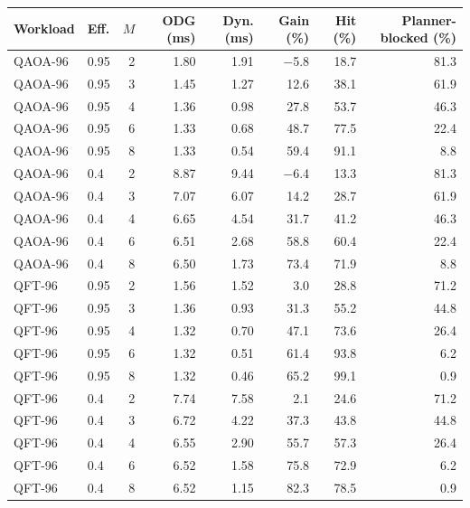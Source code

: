 \begin{tabular}{llrrrrrr}
\toprule
Workload & Eff. & $M$ & ODG (ms) & Dyn. (ms) & Gain (\%) & Hit (\%) & Planner-blocked (\%) \\
\midrule
QAOA-96 & 0.95 & 2 & 1.80 & 1.91 & $-$5.8 & 18.7 & 81.3 \\
QAOA-96 & 0.95 & 3 & 1.45 & 1.27 & 12.6 & 38.1 & 61.9 \\
QAOA-96 & 0.95 & 4 & 1.36 & 0.98 & 27.8 & 53.7 & 46.3 \\
QAOA-96 & 0.95 & 6 & 1.33 & 0.68 & 48.7 & 77.5 & 22.4 \\
QAOA-96 & 0.95 & 8 & 1.33 & 0.54 & 59.4 & 91.1 & 8.8 \\
QAOA-96 & 0.4 & 2 & 8.87 & 9.44 & $-$6.4 & 13.3 & 81.3 \\
QAOA-96 & 0.4 & 3 & 7.07 & 6.07 & 14.2 & 28.7 & 61.9 \\
QAOA-96 & 0.4 & 4 & 6.65 & 4.54 & 31.7 & 41.2 & 46.3 \\
QAOA-96 & 0.4 & 6 & 6.51 & 2.68 & 58.8 & 60.4 & 22.4 \\
QAOA-96 & 0.4 & 8 & 6.50 & 1.73 & 73.4 & 71.9 & 8.8 \\
QFT-96 & 0.95 & 2 & 1.56 & 1.52 & 3.0 & 28.8 & 71.2 \\
QFT-96 & 0.95 & 3 & 1.36 & 0.93 & 31.3 & 55.2 & 44.8 \\
QFT-96 & 0.95 & 4 & 1.32 & 0.70 & 47.1 & 73.6 & 26.4 \\
QFT-96 & 0.95 & 6 & 1.32 & 0.51 & 61.4 & 93.8 & 6.2 \\
QFT-96 & 0.95 & 8 & 1.32 & 0.46 & 65.2 & 99.1 & 0.9 \\
QFT-96 & 0.4 & 2 & 7.74 & 7.58 & 2.1 & 24.6 & 71.2 \\
QFT-96 & 0.4 & 3 & 6.72 & 4.22 & 37.3 & 43.8 & 44.8 \\
QFT-96 & 0.4 & 4 & 6.55 & 2.90 & 55.7 & 57.3 & 26.4 \\
QFT-96 & 0.4 & 6 & 6.52 & 1.58 & 75.8 & 72.9 & 6.2 \\
QFT-96 & 0.4 & 8 & 6.52 & 1.15 & 82.3 & 78.5 & 0.9 \\
\bottomrule
\end{tabular}
